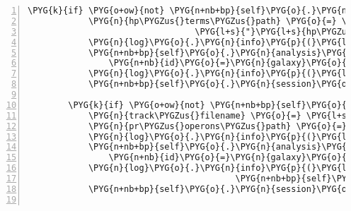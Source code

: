 \begin{Verbatim}[commandchars=\\\{\},numbers=left,firstnumber=1,stepnumber=5]
        \PYG{k}{if} \PYG{o+ow}{not} \PYG{n+nb+bp}{self}\PYG{o}{.}\PYG{n}{analysis}\PYG{o}{.}\PYG{n}{galaxy\PYGZus{}hp\PYGZus{}terms}\PYG{p}{:}
            \PYG{n}{hp\PYGZus{}terms\PYGZus{}path} \PYG{o}{=} \PYG{n}{join}\PYG{p}{(}\PYG{n+nb+bp}{self}\PYG{o}{.}\PYG{n}{analysis}\PYG{o}{.}\PYG{n}{data\PYGZus{}dir}\PYG{p}{,}
                                 \PYG{l+s}{"}\PYG{l+s}{hp\PYGZus{}terminators.bigbed}\PYG{l+s}{"}\PYG{p}{)}
            \PYG{n}{log}\PYG{o}{.}\PYG{n}{info}\PYG{p}{(}\PYG{l+s}{"}\PYG{l+s}{uploading hp\PYGZus{}terminators.bigbed to galaxy}\PYG{l+s}{"}\PYG{p}{)}
            \PYG{n+nb+bp}{self}\PYG{o}{.}\PYG{n}{analysis}\PYG{o}{.}\PYG{n}{galaxy\PYGZus{}hp\PYGZus{}terms} \PYG{o}{=} \PYG{n}{GalaxyDataset}\PYG{p}{(}
                \PYG{n+nb}{id}\PYG{o}{=}\PYG{n}{galaxy}\PYG{o}{.}\PYG{n}{upload}\PYG{p}{(}\PYG{n+nb}{open}\PYG{p}{(}\PYG{n}{hp\PYGZus{}terms\PYGZus{}path}\PYG{p}{)}\PYG{p}{,} \PYG{n+nb+bp}{self}\PYG{o}{.}\PYG{n}{hp\PYGZus{}terms\PYGZus{}name}\PYG{p}{)}\PYG{p}{)}
            \PYG{n}{log}\PYG{o}{.}\PYG{n}{info}\PYG{p}{(}\PYG{l+s}{"}\PYG{l+s}{...done - id: }\PYG{l+s+si}{\PYGZpc{}s}\PYG{l+s}{"} \PYG{o}{\PYGZpc{}} \PYG{n+nb+bp}{self}\PYG{o}{.}\PYG{n}{analysis}\PYG{o}{.}\PYG{n}{galaxy\PYGZus{}hp\PYGZus{}terms}\PYG{o}{.}\PYG{n}{id}\PYG{p}{)}
            \PYG{n+nb+bp}{self}\PYG{o}{.}\PYG{n}{session}\PYG{o}{.}\PYG{n}{commit}\PYG{p}{(}\PYG{p}{)}

        \PYG{k}{if} \PYG{o+ow}{not} \PYG{n+nb+bp}{self}\PYG{o}{.}\PYG{n}{analysis}\PYG{o}{.}\PYG{n}{galaxy\PYGZus{}pr\PYGZus{}operons}\PYG{p}{:}
            \PYG{n}{track\PYGZus{}filename} \PYG{o}{=} \PYG{l+s}{"}\PYG{l+s}{rna-seqlyze-operon\PYGZus{}predictions.bigbed}\PYG{l+s}{"}
            \PYG{n}{pr\PYGZus{}operons\PYGZus{}path} \PYG{o}{=} \PYG{n}{join}\PYG{p}{(}\PYG{n+nb+bp}{self}\PYG{o}{.}\PYG{n}{analysis}\PYG{o}{.}\PYG{n}{data\PYGZus{}dir}\PYG{p}{,} \PYG{n}{track\PYGZus{}filename}\PYG{p}{)}
            \PYG{n}{log}\PYG{o}{.}\PYG{n}{info}\PYG{p}{(}\PYG{l+s}{"}\PYG{l+s}{uploading }\PYG{l+s+si}{\PYGZpc{}s}\PYG{l+s}{ to galaxy}\PYG{l+s}{"} \PYG{o}{\PYGZpc{}} \PYG{n}{track\PYGZus{}filename}\PYG{p}{)}
            \PYG{n+nb+bp}{self}\PYG{o}{.}\PYG{n}{analysis}\PYG{o}{.}\PYG{n}{galaxy\PYGZus{}pr\PYGZus{}operons} \PYG{o}{=} \PYG{n}{GalaxyDataset}\PYG{p}{(}
                \PYG{n+nb}{id}\PYG{o}{=}\PYG{n}{galaxy}\PYG{o}{.}\PYG{n}{upload}\PYG{p}{(}\PYG{n+nb}{open}\PYG{p}{(}\PYG{n}{pr\PYGZus{}operons\PYGZus{}path}\PYG{p}{)}\PYG{p}{,} \PYG{n+nb+bp}{self}\PYG{o}{.}\PYG{n}{pr\PYGZus{}operons\PYGZus{}name}\PYG{p}{)}\PYG{p}{)}
            \PYG{n}{log}\PYG{o}{.}\PYG{n}{info}\PYG{p}{(}\PYG{l+s}{"}\PYG{l+s}{...done - id: }\PYG{l+s+si}{\PYGZpc{}s}\PYG{l+s}{"} \PYG{o}{\PYGZpc{}}
                                         \PYG{n+nb+bp}{self}\PYG{o}{.}\PYG{n}{analysis}\PYG{o}{.}\PYG{n}{galaxy\PYGZus{}pr\PYGZus{}operons}\PYG{o}{.}\PYG{n}{id}\PYG{p}{)}
            \PYG{n+nb+bp}{self}\PYG{o}{.}\PYG{n}{session}\PYG{o}{.}\PYG{n}{commit}\PYG{p}{(}\PYG{p}{)}


\end{Verbatim}

